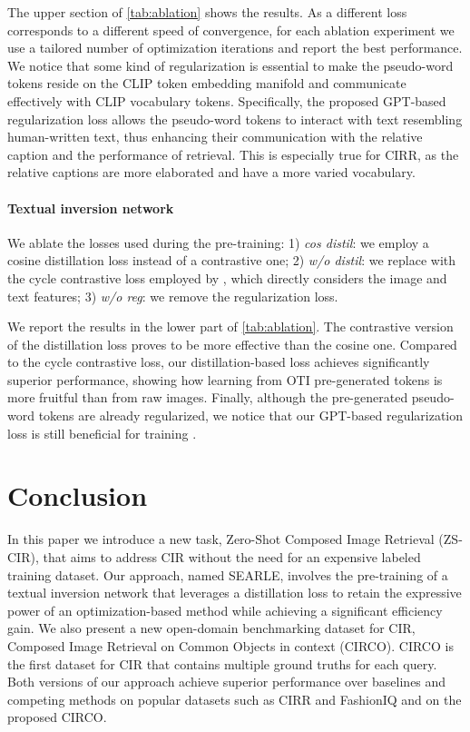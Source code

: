 \documentclass[10pt,twocolumn,letterpaper]{article}
\newcommand{\method}{SEARLE\xspace}
\begin{document}
The upper section of \cref{tab:ablation} shows the results. As a different loss corresponds to a different speed of convergence, for each ablation experiment we use a tailored number of optimization iterations and report the best performance. 
We notice that some kind of regularization is essential to make the pseudo-word tokens reside on the CLIP token embedding manifold and communicate effectively with CLIP vocabulary tokens. Specifically, the proposed GPT-based regularization loss allows the pseudo-word tokens to interact with text resembling human-written text, thus enhancing their communication with the relative caption and the performance of retrieval. This is especially true for CIRR, as the relative captions are more elaborated and have a more varied vocabulary.

\paragraph{Textual inversion network } \label{sec:ablation_phi}
We ablate the losses used during the pre-training: 1) \textit{cos distil}: we employ a cosine distillation loss instead of a contrastive one;  2) \textit{w/o distil}: we replace  with the cycle contrastive loss employed by \cite{cohen2022this}, which directly considers the image and text features; 3) \textit{w/o reg}: we remove the  regularization loss.

We report the results in the lower part of \cref{tab:ablation}. The contrastive version of the distillation loss proves to be more effective than the cosine one. Compared to the cycle contrastive loss, our distillation-based loss achieves significantly superior performance, showing how learning from OTI pre-generated tokens is more fruitful than from raw images. Finally, although the pre-generated pseudo-word tokens are already regularized, we notice that our GPT-based regularization loss is still beneficial for training .



\section{Conclusion}
In this paper we introduce a new task, Zero-Shot Composed Image Retrieval (ZS-CIR), that aims to address CIR without the need for an expensive labeled training dataset. Our approach, named \method, involves the pre-training of a textual inversion network that leverages a distillation loss to retain the expressive power of an optimization-based method while achieving a significant efficiency gain. We also present a new open-domain benchmarking dataset for CIR, Composed Image Retrieval on Common Objects in context (CIRCO). CIRCO is the first dataset for CIR that contains multiple ground truths for each query. Both versions of our approach achieve superior performance over baselines and competing methods on popular datasets such as CIRR and FashionIQ and on the proposed CIRCO.
\end{document}
